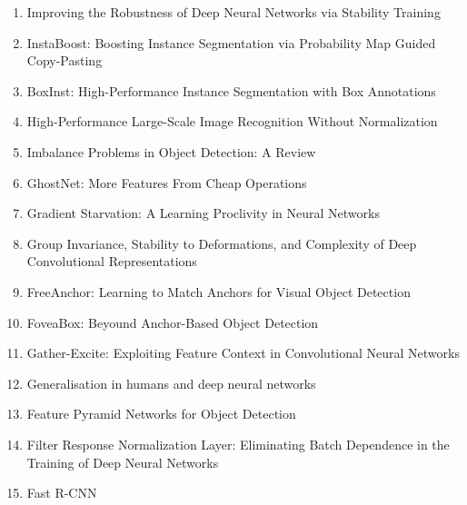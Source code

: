 \documentclass[acmlarge]{acmart}
\begin{document}
\begin{enumerate}
	\item Improving the Robustness of Deep Neural Networks via Stability Training \cite{Zheng2016ImprovingTR} 

	\item InstaBoost: Boosting Instance Segmentation via Probability Map Guided Copy-Pasting \cite{Fang2019InstaBoostBI} 

	\item BoxInst: High-Performance Instance Segmentation with Box Annotations \cite{Tian2021BoxInstHI} 

	\item High-Performance Large-Scale Image Recognition Without Normalization \cite{Brock2021HighPerformanceLI} 

	\item Imbalance Problems in Object Detection: A Review \cite{Oksuz2021ImbalancePI} 

	\item GhostNet: More Features From Cheap Operations \cite{Han2020GhostNetMF} 

	\item Gradient Starvation: A Learning Proclivity in Neural Networks \cite{Pezeshki2020GradientSA} 

	\item Group Invariance, Stability to Deformations, and Complexity of Deep Convolutional Representations \cite{Bietti2019GroupIS} 

	\item FreeAnchor: Learning to Match Anchors for Visual Object Detection \cite{Zhang2019FreeAnchorLT} 

	\item FoveaBox: Beyound Anchor-Based Object Detection \cite{Kong2020FoveaBoxBA} 

	\item Gather-Excite: Exploiting Feature Context in Convolutional Neural Networks \cite{Hu2018GatherExciteEF} 

	\item Generalisation in humans and deep neural networks \cite{Geirhos2018GeneralisationIH} 

	\item Feature Pyramid Networks for Object Detection \cite{Lin2017FeaturePN} 

	\item Filter Response Normalization Layer: Eliminating Batch Dependence in the Training of Deep Neural Networks \cite{Singh2020FilterRN} 

	\item Fast R-CNN \cite{Girshick2015FastR} 


\end{enumerate}
\end{document}
